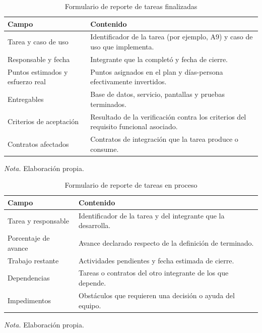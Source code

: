 \begin{table}[H]
\caption{Formulario de reporte de tareas finalizadas}
\label{tab:form_finalizadas}
\begin{threeparttable}
\begin{tabular}{>{\raggedright\arraybackslash}p{4cm} >{\raggedright\arraybackslash}p{9cm}}
\toprule
Campo & Contenido \\
\midrule
Tarea y caso de uso & Identificador de la tarea (por ejemplo, A9) y caso de uso que implementa. \\
Responsable y fecha & Integrante que la completó y fecha de cierre. \\
Puntos estimados y esfuerzo real & Puntos asignados en el plan y días-persona efectivamente invertidos. \\
Entregables & Base de datos, servicio, pantallas y pruebas terminados. \\
Criterios de aceptación & Resultado de la verificación contra los criterios del requisito funcional asociado. \\
Contratos afectados & Contratos de integración que la tarea produce o consume. \\
\bottomrule
\end{tabular}
\begin{tablenotes}
\item \textit{Nota.} Elaboración propia.
\end{tablenotes}
\end{threeparttable}
\end{table}

\begin{table}[H]
\caption{Formulario de reporte de tareas en proceso}
\label{tab:form_proceso}
\begin{threeparttable}
\begin{tabular}{>{\raggedright\arraybackslash}p{4cm} >{\raggedright\arraybackslash}p{9cm}}
\toprule
Campo & Contenido \\
\midrule
Tarea y responsable & Identificador de la tarea y del integrante que la desarrolla. \\
Porcentaje de avance & Avance declarado respecto de la definición de terminado. \\
Trabajo restante & Actividades pendientes y fecha estimada de cierre. \\
Dependencias & Tareas o contratos del otro integrante de los que depende. \\
Impedimentos & Obstáculos que requieren una decisión o ayuda del equipo. \\
\bottomrule
\end{tabular}
\begin{tablenotes}
\item \textit{Nota.} Elaboración propia.
\end{tablenotes}
\end{threeparttable}
\end{table}

